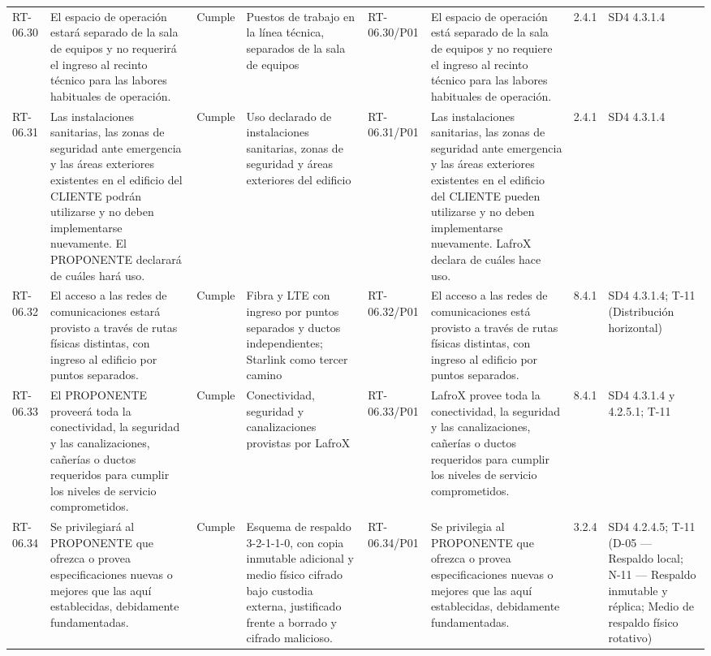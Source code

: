 \documentclass[oficio,firma,final]{lafrox}
\begin{document}
\begin{landscape}
{\begin{longtable}{@{}F{0.054} F{0.173} F{0.061} F{0.191} F{0.106} F{0.180} F{0.067} F{0.168}@{}}
  RT-06.30 & El espacio de operación estará separado de la sala de equipos y no requerirá el ingreso al recinto técnico para las labores habituales de operación. & Cumple & Puestos de trabajo en la línea técnica, separados de la sala de equipos & RT-06.30/\allowbreak{}P01 & El espacio de operación está separado de la sala de equipos y no requiere el ingreso al recinto técnico para las labores habituales de operación. & 2.4.1 & SD4 4.3.1.4  \\
  RT-06.31 & Las instalaciones sanitarias, las zonas de seguridad ante emergencia y las áreas exteriores existentes en el edificio del CLIENTE podrán utilizarse y no deben implementarse nuevamente. El PROPONENTE declarará de cuáles hará uso. & Cumple & Uso declarado de instalaciones sanitarias, zonas de seguridad y áreas exteriores del edificio & RT-06.31/\allowbreak{}P01 & Las instalaciones sanitarias, las zonas de seguridad ante emergencia y las áreas exteriores existentes en el edificio del CLIENTE pueden utilizarse y no deben implementarse nuevamente. LafroX declara de cuáles hace uso. & 2.4.1 & SD4 4.3.1.4  \\
  RT-06.32 & El acceso a las redes de comunicaciones estará provisto a través de rutas físicas distintas, con ingreso al edificio por puntos separados. & Cumple & Fibra y LTE con ingreso por puntos separados y ductos independientes; Starlink como tercer camino & RT-06.32/\allowbreak{}P01 & El acceso a las redes de comunicaciones está provisto a través de rutas físicas distintas, con ingreso al edificio por puntos separados. & 8.4.1 & SD4 4.3.1.4; T-11 (Distribución horizontal)  \\
  RT-06.33 & El PROPONENTE proveerá toda la conectividad, la seguridad y las canalizaciones, cañerías o ductos requeridos para cumplir los niveles de servicio comprometidos. & Cumple & Conectividad, seguridad y canalizaciones provistas por LafroX & RT-06.33/\allowbreak{}P01 & LafroX provee toda la conectividad, la seguridad y las canalizaciones, cañerías o ductos requeridos para cumplir los niveles de servicio comprometidos. & 8.4.1 & SD4 4.3.1.4 y 4.2.5.1; T-11  \\
  RT-06.34 & Se privilegiará al PROPONENTE que ofrezca o provea especificaciones nuevas o mejores que las aquí establecidas, debidamente fundamentadas. & Cumple & Esquema de respaldo 3-2-1-1-0, con copia inmutable adicional y medio físico cifrado bajo custodia externa, justificado frente a borrado y cifrado malicioso. & RT-06.34/\allowbreak{}P01 & Se privilegia al PROPONENTE que ofrezca o provea especificaciones nuevas o mejores que las aquí establecidas, debidamente fundamentadas. & 3.2.4 & SD4 4.2.4.5; T-11 (D-05 — Respaldo local; N-11 — Respaldo inmutable y réplica; Medio de respaldo físico rotativo)  \\

\end{longtable}}
\end{landscape}
\end{document}
